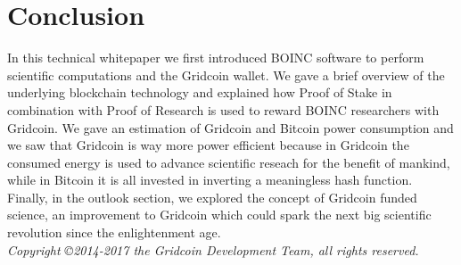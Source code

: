 \section{Conclusion}

In this technical whitepaper we first introduced BOINC software to perform scientific computations and the Gridcoin wallet. We gave a brief overview of the underlying blockchain technology and explained how Proof of Stake in combination with Proof of Research is used to reward BOINC researchers with Gridcoin. We gave an estimation of Gridcoin and Bitcoin power consumption and we saw that Gridcoin is way more power efficient because in Gridcoin the consumed energy is used to advance scientific reseach for the benefit of mankind, while in Bitcoin it is all invested in inverting a meaningless hash function. Finally, in the outlook section, we explored the concept of Gridcoin funded science, an improvement to Gridcoin which could spark the next big scientific revolution since the enlightenment age.\\

\textit{Copyright \copyright  2014-2017 the Gridcoin Development Team, all rights reserved.}
